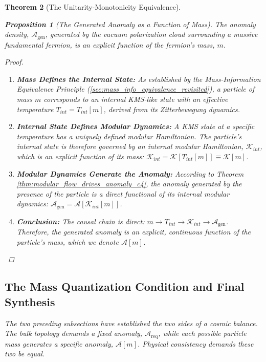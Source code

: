 \documentclass[11pt, letterpaper]{report}
\theoremstyle{plain} %
\newtheorem{theorem}{Theorem}[chapter]
\newtheorem{proposition}[theorem]{Proposition}
\theoremstyle{definition} %
\theoremstyle{remark} %
\begin{document}
\begin{theorem}[The Unitarity-Monotonicity Equivalence]
\begin{proposition}[The Generated Anomaly as a Function of Mass]
\label{prop:anomaly_is_function_of_mass_c7}
The anomaly density, $\mathcal{A}_{\text{gen}}$, generated by the vacuum polarization cloud surrounding a massive fundamental fermion, is an explicit function of the fermion's mass, $m$.
\end{proposition}
\begin{proof}
\begin{enumerate}
    \item \textbf{Mass Defines the Internal State:} As established by the Mass-Information Equivalence Principle (\cref{sec:mass_info_equivalence_revisited}), a particle of mass $m$ corresponds to an internal KMS-like state with an effective temperature $T_{int} = T_{int}[m]$, derived from its Zitterbewegung dynamics.
    
    \item \textbf{Internal State Defines Modular Dynamics:} A KMS state at a specific temperature has a uniquely defined modular Hamiltonian. The particle's internal state is therefore governed by an internal modular Hamiltonian, $\mathcal{K}_{int}$, which is an explicit function of its mass: $\mathcal{K}_{int} = \mathcal{K}[T_{int}[m]] \equiv \mathcal{K}[m]$.
    
    \item \textbf{Modular Dynamics Generate the Anomaly:} According to Theorem \ref{thm:modular_flow_drives_anomaly_c4}, the anomaly generated by the presence of the particle is a direct functional of its internal modular dynamics: $\mathcal{A}_{\text{gen}} = \mathcal{A}[\mathcal{K}_{int}[m]]$.
    
    \item \textbf{Conclusion:} The causal chain is direct: $m \to T_{int} \to \mathcal{K}_{int} \to \mathcal{A}_{\text{gen}}$. Therefore, the generated anomaly is an explicit, continuous function of the particle's mass, which we denote $\mathcal{A}[m]$.
\end{enumerate}
\end{proof}

\subsection{The Mass Quantization Condition and Final Synthesis}
\label{sec:mass_quantization_final_synthesis}
The two preceding subsections have established the two sides of a cosmic balance. The bulk topology demands a fixed anomaly, $\mathcal{A}_{\text{req}}$, while each possible particle mass generates a specific anomaly, $\mathcal{A}[m]$. Physical consistency demands these two be equal.


\end{theorem}
\end{document}
